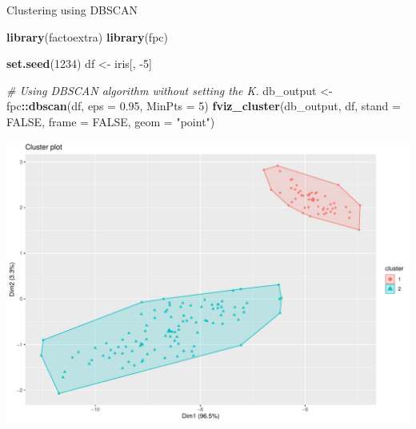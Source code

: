 \documentclass[12pt,ignorenonframetext,]{beamer}
\newenvironment{Shaded}{\begin{snugshade}}{\end{snugshade}}
\newcommand{\CommentTok}[1]{\textcolor[rgb]{0.56,0.35,0.01}{\textit{#1}}}
\newcommand{\DataTypeTok}[1]{\textcolor[rgb]{0.13,0.29,0.53}{#1}}
\newcommand{\DecValTok}[1]{\textcolor[rgb]{0.00,0.00,0.81}{#1}}
\newcommand{\FloatTok}[1]{\textcolor[rgb]{0.00,0.00,0.81}{#1}}
\newcommand{\KeywordTok}[1]{\textcolor[rgb]{0.13,0.29,0.53}{\textbf{#1}}}
\newcommand{\NormalTok}[1]{#1}
\newcommand{\OperatorTok}[1]{\textcolor[rgb]{0.81,0.36,0.00}{\textbf{#1}}}
\newcommand{\OtherTok}[1]{\textcolor[rgb]{0.56,0.35,0.01}{#1}}
\newcommand{\StringTok}[1]{\textcolor[rgb]{0.31,0.60,0.02}{#1}}
\begin{document}
\begin{frame}[fragile]{Clustering using DBSCAN}
\protect\hypertarget{clustering-using-dbscan}{}

\tiny

\begin{Shaded}
\begin{Highlighting}[]
\KeywordTok{library}\NormalTok{(factoextra)}
\KeywordTok{library}\NormalTok{(fpc)}

\KeywordTok{set.seed}\NormalTok{(}\DecValTok{1234}\NormalTok{)}
\NormalTok{df <-}\StringTok{ }\NormalTok{iris[, }\DecValTok{-5}\NormalTok{]}

\CommentTok{# Using DBSCAN algorithm without setting the K.}
\NormalTok{db_output <-}\StringTok{ }\NormalTok{fpc}\OperatorTok{::}\KeywordTok{dbscan}\NormalTok{(df, }\DataTypeTok{eps =} \FloatTok{0.95}\NormalTok{, }\DataTypeTok{MinPts =} \DecValTok{5}\NormalTok{)}
\KeywordTok{fviz_cluster}\NormalTok{(db_output, df, }\DataTypeTok{stand =} \OtherTok{FALSE}\NormalTok{, }\DataTypeTok{frame =} \OtherTok{FALSE}\NormalTok{, }\DataTypeTok{geom =} \StringTok{"point"}\NormalTok{)}
\end{Highlighting}
\end{Shaded}

\begin{center}\includegraphics[width=0.7\linewidth,height=0.6\textheight]{figs/unnamed-chunk-17} \end{center}

\normalsize

\end{frame}
\end{document}

